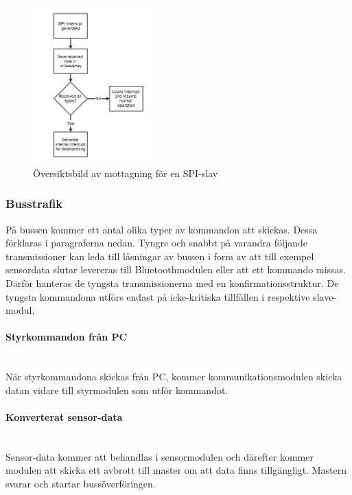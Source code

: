 \documentclass[a4paper,12pt,fleqn]{article}
\begin{document}
\begin{figure}[htp] %
  \begin{center}
  \includegraphics[keepaspectratio=true,width=0.4\textwidth]{bilder/spislaverec.jpg}  %
  \end{center}
  \caption{Översiktsbild av mottagning för en SPI-slav} %
  \label{fig:spislave}
\end{figure}

\subsubsection{Busstrafik}
På bussen kommer ett antal olika typer av kommandon att skickas. Dessa förklaras i paragraferna nedan. 
Tyngre och snabbt på varandra följande transmissioner kan leda till låsningar av bussen i form av att till exempel sensordata slutar levereras till Bluetoothmodulen eller att ett kommando missas. Därför hanteras de tyngsta transmissionerna med en konfirmationsstruktur.
De tyngsta kommandona utförs endast på icke-kritiska tillfällen i respektive slave-modul.

\paragraph{Styrkommandon från PC}
~\\
När styrkommandona skickas från PC, kommer kommunikationsmodulen skicka datan vidare till styrmodulen som utför kommandot.
\paragraph{Konverterat sensor-data}
~\\
Sensor-data kommer att behandlas i sensormodulen och därefter kommer modulen att skicka ett avbrott till master om att data finns tillgängligt. Mastern svarar och startar bussöverföringen.
\end{document}
